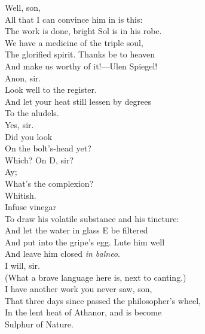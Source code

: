 \documentclass[a4paper,oneside,12pt]{memoir}
\begin{document}
\begin{drama*}
\subtlespeaks {} Well, son,\\
All that I can convince him in is this:\\
The work is done, bright Sol is in his robe.\\
We have a medicine of the triple soul,\\
The glorified spirit. Thanks be to heaven\\
And make us worthy of it!---Ulen Spiegel!\\
\facespeaks {} Anon, sir.\\
\subtlespeaks {} Look well to the register.\\
And let your heat still lessen by degrees\\
To the aludels.\\
\facespeaks {} Yes, sir.\\
\subtlespeaks {} Did you look\\
On the bolt's-head yet?\\
\facespeaks {} Which? On D, sir?\\
\subtlespeaks {} Ay;\\
What's the complexion?\\
\facespeaks {} Whitish.\\
\subtlespeaks {} Infuse vinegar\\
To draw his volatile substance and his tincture:\\
And let the water in glass E be filtered\\
And put into the gripe's egg. Lute him well\\
And leave him closed \emph{in balneo}.\\
\facespeaks {} I will, sir.\\
\surlyspeaks (What a brave language here is, next to canting.)\\
\subtlespeaks I have another work you never saw, son,\\
That three days since passed the philosopher's wheel,\\
In the lent heat of Athanor, and is become\\
Sulphur of Nature.\\

\end{drama*}
\end{document}
